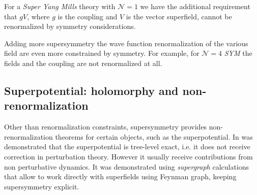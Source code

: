 For a \emph{Super Yang Mills} theory with $\mathcal{N} = 1$ we have the additional requirement that $g V$, where $g$ is the coupling and $V$ is the vector superfield, cannot be renormalized by symmetry considerations. 

Adding more supersymmetry the wave function renormalization of the various field are even more constrained by symmetry.
For example, for $\mathcal{N}=4$ \emph{SYM}  the fields and the coupling are not renormalized at all.



\subsection{Superpotential: holomorphy and non-renormalization}
Other than renormalization constraints, supersymmetry provides non-renormalization theorems for certain objects, such as the superpotential.
In \cite{Grisaru:1979wc} was demonstrated that the superpotential is tree-level exact, i.e. it does not receive correction in perturbation theory. 
However it usually receive contributions from non perturbative dynamics.
It was demonstrated using \emph{supergraph} calculations that allow to work directly with superfields using Feynman graph, keeping supersymmetry explicit. 

